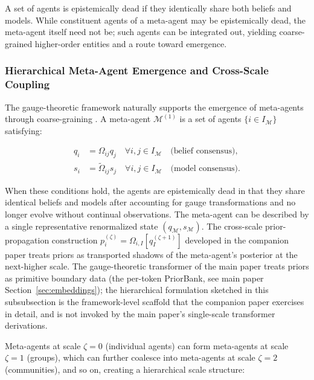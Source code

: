 \documentclass[twoside,11pt]{article}
\begin{document}
A set of agents is epistemically dead if they identically share both beliefs and models. While constituent agents of a meta-agent may be epistemically dead, the meta-agent itself need not be; such agents can be integrated out, yielding coarse-grained higher-order entities and a route toward emergence.

\subsubsection{Hierarchical Meta-Agent Emergence and Cross-Scale Coupling}
\label{sec:appendix_meta_agent}

The gauge-theoretic framework naturally supports the emergence of meta-agents through coarse-graining \citep{kadanoff1966scaling,wilson1974renormalization}. A meta-agent $\mathcal{M}^{(1)}$ is a set of agents $\{i \in I_{\mathcal{M}}\}$ satisfying:

\begin{align}
q_i &= \Omega_{ij} q_j \quad \forall i,j \in I_{\mathcal{M}} \quad \text{(belief consensus)}, \label{eq:belief_consensus} \\
s_i &= \tilde{\Omega}_{ij} s_j \quad \forall i,j \in I_{\mathcal{M}} \quad \text{(model consensus)}. \label{eq:model_consensus}
\end{align}

When these conditions hold, the agents are epistemically dead in that they share identical beliefs and models after accounting for gauge transformations and no longer evolve without continual observations. The meta-agent can be described by a single representative renormalized state $(q_{\mathcal{M}}, s_{\mathcal{M}})$. The cross-scale prior-propagation construction $p_i^{(\zeta)} = \Omega_{i,I}[q_I^{(\zeta+1)}]$ developed in the companion paper \citep{Dennis2025it} treats priors as transported shadows of the meta-agent's posterior at the next-higher scale. The gauge-theoretic transformer of the main paper treats priors as primitive boundary data (the per-token PriorBank, see main paper Section~\ref{sec:embeddings}); the hierarchical formulation sketched in this subsubsection is the framework-level scaffold that the companion paper exercises in detail, and is not invoked by the main paper's single-scale transformer derivations.

Meta-agents at scale $\zeta=0$ (individual agents) can form meta-agents at scale $\zeta=1$ (groups), which can further coalesce into meta-agents at scale $\zeta=2$ (communities), and so on, creating a hierarchical scale structure:
\end{document}
